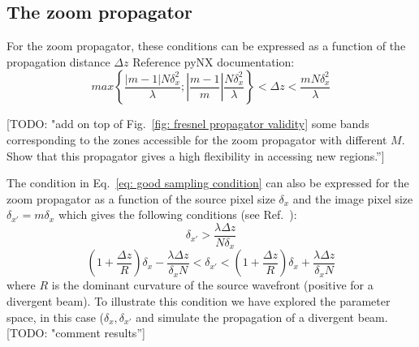 \documentclass{iucr}              %
\newcommand{\todo}[1]{{\color{red}[TODO: "#1'']}}
\newcommand{\inred}[1]{{\color{red}#1}}
\begin{document}
\subsection{The zoom propagator}

For the zoom propagator, these conditions can be expressed as a function of the propagation distance $\Delta z$ \inred{Reference pyNX documentation}:
\begin{equation}\label{eq: good sampling zoom pynx}
max\left\{ \frac{|m-1| N \delta_x^2}{\lambda}; \left| \frac{m-1}{m} \right|\frac{N \delta_x^2}{\lambda} \right\} < \Delta z < \frac{m N \delta_x^2}{\lambda}
\end{equation}

\todo{add on top of Fig.~\ref{fig: fresnel propagator validity} some bands corresponding to the zones accessible for the zoom propagator with different $M$. Show that this propagator gives a high flexibility in accessing new regions.} 

The condition in Eq.~\ref{eq: good sampling condition} can also be expressed for the zoom propagator as a function of the source pixel size $\delta_x$ and the image pixel size $\delta_{x'}=m \delta_x$ which gives the following conditions (see Ref.~\cite{pirro}):
\begin{equation}\label{eq: good sampling pirro condition one}
\delta_{x'} > \frac{\lambda \Delta z}{N \delta_x}
\end{equation}
\begin{equation}\label{eq: good sampling pirro condition two}
\left(1+\frac{\Delta z}{R}\right) \delta_x -
\frac{\lambda \Delta z}{\delta_x N}
< \delta_{x'} < 
\left( 1 + \frac{\Delta z}{R}\right) \delta_x + \frac{\lambda \Delta z}{\delta_x N}
\end{equation}
where $R$ is the dominant curvature of the source wavefront (positive for a divergent beam). To illustrate this condition we have explored the parameter space, in this case ($\delta_x,\delta_{x'}$ and simulate the propagation of a divergent beam. \todo{comment results}
\end{document}
